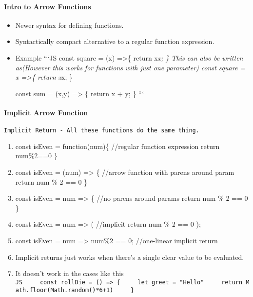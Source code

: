 \documentclass[
  paper=a4,
  ,captions=tableheading
]{scrartcl}
\providecommand{\tightlist}{%
  \setlength{\itemsep}{0pt}\setlength{\parskip}{0pt}}
\begin{document}
\hypertarget{intro-to-arrow-functions}{%
\paragraph{Intro to Arrow Functions}\label{intro-to-arrow-functions}}

\begin{itemize}
\item
  Newer syntax for defining functions.
\item
  Syntactically compact alternative to a regular function expression.
\item
  Example ```JS const square = (x) =\textgreater\{ return x\emph{x; \}
  This can also be written as(However this works for functions with just
  one parameter) const square = x =\textgreater\{ return x}x; \}

  const sum = (x,y) =\textgreater{} \{ return x + y; \} ```
\end{itemize}

\hypertarget{implicit-arrow-function}{%
\paragraph{Implicit Arrow Function}\label{implicit-arrow-function}}

\begin{verbatim}
Implicit Return - All these functions do the same thing.
\end{verbatim}

\begin{enumerate}
\def\labelenumi{\arabic{enumi}.}
\tightlist
\item
  const isEven = function(num)\{ //regular function expression return
  num\%2==0 \}
\item
  const isEven = (num) =\textgreater{} \{ //arrow function with parens
  around param return num \% 2 == 0 \}
\item
  const isEven = num =\textgreater{} \{ //no parens around params return
  num \% 2 == 0 \}
\item
  const isEven = num =\textgreater{} ( //implicit return num \% 2 == 0
  );
\item
  const isEven = num =\textgreater{} num\%2 == 0; //one-linear implicit
  return
\item
  Implicit returns just works when there's a single clear value to be
  evaluated.
\item
  It doesn't work in the cases like this
  \texttt{JS\ \ \ \ \ const\ rollDie\ =\ ()\ =\textgreater{}\ \{\ \ \ \ \ let\ greet\ =\ "Hello"\ \ \ \ \ return\ Math.floor(Math.random()*6+1)\ \ \ \ \ \}}
\end{enumerate}
\end{document}
